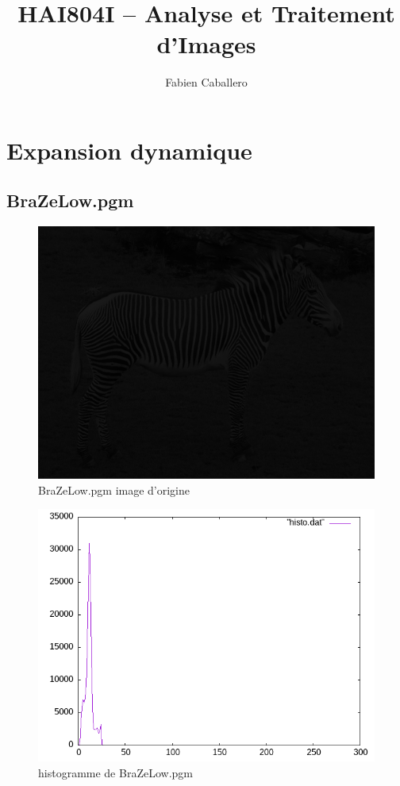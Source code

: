 \documentclass{article}
\title{HAI804I – Analyse et Traitement d'Images}
\author{Fabien Caballero }
\begin{document}
  

\maketitle
    \tableofcontents

\newpage

\section{Expansion dynamique}

\subsection{BraZeLow.pgm}
\begin{figure}[h]
\centerline{\includegraphics[scale=0.5]{./rendus/BraZeLow.png}}
\caption{BraZeLow.pgm image d'origine}
\end{figure}

\begin{figure}[h]
\centerline{\includegraphics[scale=0.5]{./rendus/histoBraZeLowPGM.png}}
\caption{histogramme de BraZeLow.pgm}
\end{figure}
\end{document}
